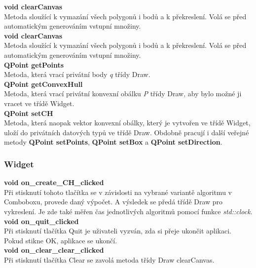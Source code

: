 \documentclass[a4paper,11pt,twoside]{article}
\begin{document}
\noindent\textbf{void clearCanvas}\\
Metoda sloužící k vymazání všech polygonů i bodů a k překreslení. Volá se před automatickým generováním vstupní množiny. \\

\noindent\textbf{void clearCanvas}\\
Metoda sloužící k vymazání všech polygonů i bodů a k překreslení. Volá se před automatickým generováním vstupní množiny. \\

\noindent\textbf{QPoint getPoints}\\
Metoda, která vrací privátní body \textit{q} třídy Draw.\\

\noindent\textbf{QPoint getConvexHull}\\
Metoda, která vrací privátní konvexní obálku \textit{P} třídy Draw, aby bylo možné ji vracet ve třídě Widget. \\

\noindent\textbf{QPoint  setCH}\\
Metoda, která naopak vektor konvexní obálky, který je vytvořen ve třídě Widget, uloží do privátních datových typů ve třídě Draw.
Obdobně pracují i další veřejné metody \textbf{QPoint  setPoints}, \textbf{QPoint  setBox} a \textbf{QPoint  setDirection}.

\newpage
\vspace*{-1cm}
\subsubsection{Widget}
\noindent\textbf{void on\_create\_CH\_clicked}\\
Při stisknutí tohoto tlačítka se v závislosti na vybrané variantě algoritmu v Comboboxu, provede daný výpočet. A výsledek se předá třídě Draw pro vykreslení. Je zde také měřen čas jednotlivých algoritmů pomocí funkce \textit{std::clock}.\\

\noindent\textbf{void on\_quit\_clicked}\\
Při stisknutí tlačítka Quit je uživateli vyzván, zda si přeje ukončit aplikaci. Pokud stikne OK, aplikace se ukončí.\\

\noindent\textbf{void on\_clear\_clear\_clicked}\\
Při stisknutí tlačítka Clear se zavolá metoda třídy Draw clearCanvas.\\
\end{document}
